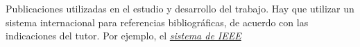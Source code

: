 \begin{thebibliography}{99}
 Publicaciones utilizadas en el estudio y desarrollo del trabajo.
Hay que utilizar un sistema internacional para referencias bibliográficas, de acuerdo con las indicaciones del tutor. Por ejemplo, el 
\href{https://www.etsiinf.upm.es/docs/estudios/grado/1475_ieeecitationref.pdf}{\emph{sistema de IEEE}}

\end{thebibliography}
